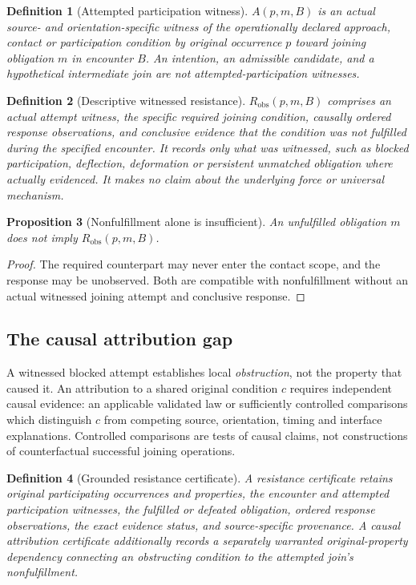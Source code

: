 \documentclass[11pt]{article}
\newtheorem{definition}{Definition}[section]
\newtheorem{proposition}[definition]{Proposition}
\begin{document}
\begin{definition}[Attempted participation witness]
$A(p,m,B)$ is an actual source- and orientation-specific
witness of the operationally declared approach, contact
or participation condition by original occurrence $p$
toward joining obligation $m$ in encounter $B$.
An intention, an admissible candidate, and a hypothetical
intermediate join are not attempted-participation witnesses.
\end{definition}

\begin{definition}[Descriptive witnessed resistance]
$R_{\mathrm{obs}}(p,m,B)$ comprises an actual attempt
witness, the specific required joining condition,
causally ordered response observations, and conclusive
evidence that the condition was not fulfilled during
the specified encounter. It records only what was
witnessed, such as blocked participation, deflection,
deformation or persistent unmatched obligation where
actually evidenced. It makes no claim about the
underlying force or universal mechanism.
\end{definition}

\begin{proposition}[Nonfulfillment alone is insufficient]
An unfulfilled obligation $m$ does not imply
$R_{\mathrm{obs}}(p,m,B)$.
\end{proposition}
\begin{proof}
The required counterpart may never enter the contact
scope, and the response may be unobserved. Both are
compatible with nonfulfillment without an actual
witnessed joining attempt and conclusive response.
\end{proof}

\subsection{The causal attribution gap}
A witnessed blocked attempt establishes local
\emph{obstruction}, not the property that caused it.
An attribution to a shared original condition $c$
requires independent causal evidence: an applicable
validated law or sufficiently controlled comparisons
which distinguish $c$ from competing source, orientation,
timing and interface explanations. Controlled comparisons
are tests of causal claims, not constructions of
counterfactual successful joining operations.

\begin{definition}[Grounded resistance certificate]
A resistance certificate retains original participating
occurrences and properties, the encounter and attempted
participation witnesses, the fulfilled or defeated
obligation, ordered response observations, the exact
evidence status, and source-specific provenance.
A \emph{causal attribution certificate} additionally
records a separately warranted original-property
dependency connecting an obstructing condition to
the attempted join's nonfulfillment.
\end{definition}
\end{document}
